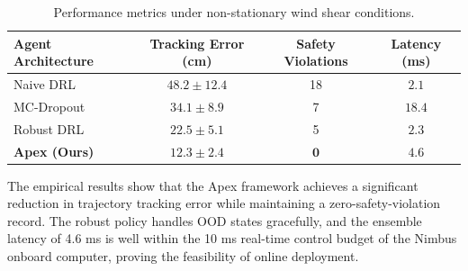 \begin{table}[htbp]
    \centering
    \caption{Performance metrics under non-stationary wind shear conditions.}
    \begin{tabularx}{\linewidth}{Xccc}
        \toprule
        \rowcolor{bglight}
        \textbf{Agent Architecture} & \textbf{Tracking Error (cm)} & \textbf{Safety Violations} & \textbf{Latency (ms)} \\
        \midrule
        Naive DRL                   & $48.2 \pm 12.4$              & 18                         & $\mathbf{2.1}$        \\
        MC-Dropout                  & $34.1 \pm 8.9$               & 7                          & $18.4$                \\
        Robust DRL                  & $22.5 \pm 5.1$               & 5                          & $2.3$                 \\
        \textbf{Apex (Ours)}        & $\mathbf{12.3 \pm 2.4}$      & $\mathbf{0}$               & $4.6$                 \\
        \bottomrule
    \end{tabularx}
\end{table}

The empirical results show that the Apex framework achieves a significant reduction in trajectory tracking error while maintaining a zero-safety-violation record. The robust policy handles OOD states gracefully, and the ensemble latency of 4.6 ms is well within the 10 ms real-time control budget of the Nimbus onboard computer, proving the feasibility of online deployment.


